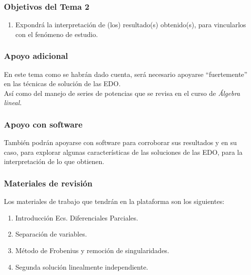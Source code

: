 \documentclass[12pt]{beamer}
\begin{document}
\begin{frame}
\frametitle{Objetivos del Tema 2}
\begin{enumerate}
\conti
\item Expondrá la interpretación de (los) resultado(s) obtenido(s), para vincularlos con el fenómeno de estudio.
\seti
\end{enumerate}
\end{frame}
\begin{frame}
\frametitle{Apoyo adicional}
En este tema como se habrán dado cuenta, será necesario apoyarse \enquote{fuertemente} en las técnicas de solución de las EDO.
\\
\bigskip
\pause
Así como del manejo de series de potencias que se revisa en el curso de \emph{Álgebra lineal.}
\end{frame}
\begin{frame}
\frametitle{Apoyo con software}
También podrán apoyarse con software para corroborar sus resultados y en su caso, para explorar algunas características de las soluciones de las EDO, para la interpretación de lo que obtienen.
\end{frame}
\begin{frame}
\frametitle{Materiales de revisión}
Los materiales de trabajo que tendrán en la plataforma son los siguientes:
\begin{enumerate}[<+->]
\item Introducción Ecs. Diferenciales Parciales.
\item Separación de variables.
\item Método de Frobenius y remoción de singularidades.
\item Segunda solución linealmente independiente.
\end{enumerate}
\end{frame}
\end{document}
